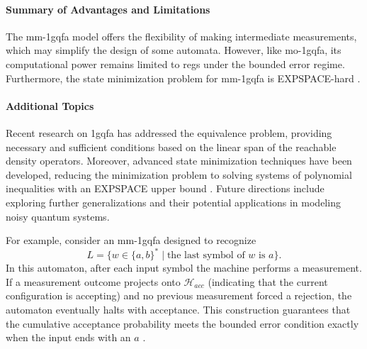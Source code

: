 \paragraph{Summary of Advantages and Limitations} 
The \gls{mm-1gqfa} model offers the flexibility of making intermediate measurements, which may simplify the design of some automata. However, like \gls{mo-1gqfa}, its computational power remains limited to \glspl{reg} under the bounded error regime. Furthermore, the state minimization problem for \gls{mm-1gqfa} is EXPSPACE-hard \cite{mateus2012complexity}.

\paragraph{Additional Topics}  
Recent research on \gls{1gqfa} has addressed the equivalence problem, providing necessary and sufficient conditions based on the linear span of the reachable density operators. Moreover, advanced state minimization techniques have been developed, reducing the minimization problem to solving systems of polynomial inequalities with an EXPSPACE upper bound \cite{mercer2008lower}. Future directions include exploring further generalizations and their potential applications in modeling noisy quantum systems.

\begin{example} 
For example, consider an \gls{mm-1gqfa} designed to recognize 
\[
L=\{w\in\{a,b\}^* \mid \text{the last symbol of }w\text{ is }a\}.
\]
In this automaton, after each input symbol the machine performs a measurement. If a measurement outcome projects onto $\mathcal{H}_{acc}$ (indicating that the current configuration is accepting) and no previous measurement forced a rejection, the automaton eventually halts with acceptance. This construction guarantees that the cumulative acceptance probability meets the bounded error condition exactly when the input ends with an $a$ \cite{li2012characterizations}.
\end{example}